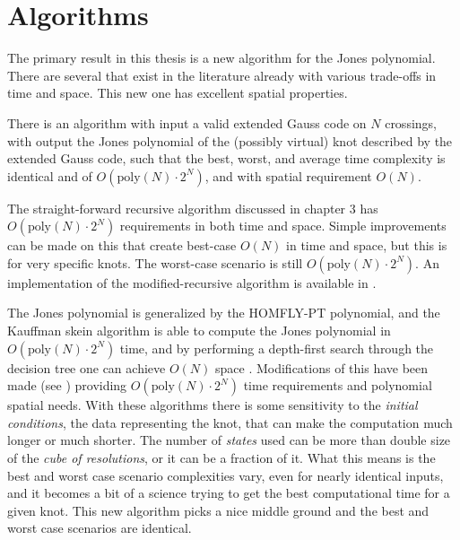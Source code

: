 \section{Algorithms}
    The primary result in this thesis is a new algorithm for the Jones
    polynomial. There are several that exist in the literature already with
    various trade-offs in time and space. This new one has excellent spatial
    properties.
    \begin{theorem}
        There is an algorithm with input a valid extended Gauss code on $N$
        crossings, with output the Jones polynomial of the (possibly virtual)
        knot described by the extended Gauss code, such that the best, worst,
        and average time complexity is identical and of
        $O(\textrm{poly}(N)\cdot{2}^{N})$, and with spatial requirement $O(N)$.
    \end{theorem}
    The straight-forward recursive algorithm discussed in chapter 3 has
    $O(\textrm{poly}(N)\cdot{2}^{N})$ requirements in both time and space.
    Simple improvements can be made on this that create best-case $O(N)$ in
    time and space, but this is for very specific knots. The worst-case scenario
    is still $O(\textrm{poly}(N)\cdot{2}^{N})$. An implementation of the
    modified-recursive algorithm is available in \cite{sage}.
    \par\hfill\par
    The Jones polynomial is generalized by the HOMFLY-PT polynomial, and the
    Kauffman skein algorithm is able to compute the Jones polynomial in
    $O(\textrm{poly}(N)\cdot{2}^{N})$ time, and by performing a depth-first
    search through the decision tree one can achieve $O(N)$ space
    \cite{Burton2018HOMFLFixedParameter}. Modifications of this have been made
    (see \cite{GOUESBET1999271}) providing
    $O(\textrm{poly}(N)\cdot{2}^{N})$ time requirements and polynomial
    spatial needs. With these algorithms there is some sensitivity to the
    \textit{initial conditions}, the data representing the knot, that can
    make the computation much longer or much shorter. The number of
    \textit{states} used can be more than double size of the
    \textit{cube of resolutions}, or it can be a fraction of it. What this
    means is the best and worst case scenario complexities vary, even for
    nearly identical inputs, and it becomes a bit of a science trying to get the
    best computational time for a given knot. This new algorithm picks a nice
    middle ground and the best and worst case scenarios are identical.
    \par\hfill\par
